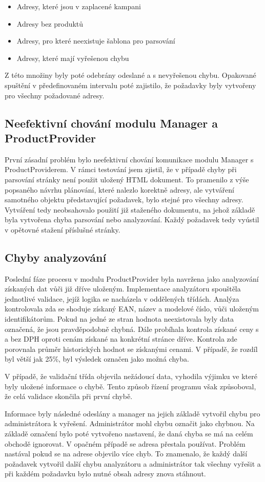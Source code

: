 \documentclass[thesis=B,czech]{FITthesis}[2012/06/26]
\begin{document}
\begin{itemize}
\item Adresy, které jsou v zaplacené kampani
\item Adresy bez produktů
\item Adresy, pro které neexistuje šablona pro parsování
\item Adresy, které mají vyřešenou chybu
\end{itemize}

Z této množiny byly poté odebrány odeslané a s nevyřešenou chybu. Opakované spuštění v předefinovaném intervalu poté 
zajistilo, že požadavky byly vytvořeny pro všechny požadované adresy.

\subsection{Neefektivní chování modulu Manager a ProductProvider}
První zásadní problém bylo neefektivní chování komunikace modulu Manager s ProductProviderem. V rámci testování jsem zjistil, že v 
případě chyby při parsování stránky není použit uložený HTML dokument.
To pramenilo z výše popsaného návrhu plánování, které nalezlo korektně adresy, ale vytváření samotného objektu představující požadavek,
bylo stejné pro všechny adresy. Vytváření tedy neobsahovalo použití již staženého dokumentu, na jehož základě byla vytvořena 
chyba parsování nebo analyzování. Každý požadavek tedy vyústil v opětovné stažení příslušné stránky.

\subsection{Chyby analyzování}
Poslední fáze procesu v modulu ProductProvider byla navržena jako analyzování získaných dat vůči již dříve uloženým. Implementace analyzátoru 
spouštěla jednotlivé validace, jejíž logika se nacházela v oddělených třídách. 
Analýza kontrolovala zda se shoduje získaný EAN, název a modelové číslo, vůči uloženým identifikátorům. Pokud na jedné ze stran hodnota neexistovala
byly data označená, že jsou pravděpodobně chybná. Dále probíhala kontrola získané ceny s a bez DPH oproti cenám získané na konkrétní stránce dříve.
Kontrola zde porovnala průměr historických hodnot se získanými cenami. V případě, že rozdíl byl větší jak 25\%, byl výsledek označen jako
možná chyba.
\par
V případě, že validační třída objevila nežádoucí data,
vyhodila výjimku ve které byly uložené informace o chybě. Tento způsob řízení programu však způsoboval, že celá validace skončila při první chybě.
\par
Informace byly následné odeslány a manager na jejich základě vytvořil chybu pro administrátora k vyřešení. Administrátor mohl 
chybu označit jako chybnou. Na základě označení bylo poté vytvořeno nastavení, že daná chyba se má na celém obchodě ignorovat. V opačném případě se adresa přestala používat. Problém nastával pokud se na adrese objevilo více chyb. To znamenalo, že každý další požadavek vytvořil další
chybu analyzátoru a administrátor tak všechny vyřešit a při každém požadavku bylo nutné obsah adresy znova stáhnout.
\end{document}
